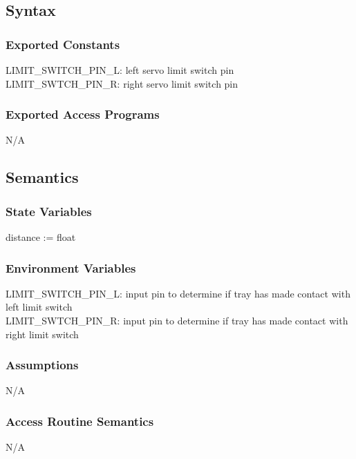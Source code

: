 \documentclass[12pt, titlepage]{article}
\begin{document}
\subsection{Syntax}

\subsubsection{Exported Constants}

LIMIT\_SWITCH\_PIN\_L: left servo limit switch pin\\
LIMIT\_SWTCH\_PIN\_R: right servo limit switch pin\\


\subsubsection{Exported Access Programs}

N/A

\subsection{Semantics}

\subsubsection{State Variables}

distance := float
\subsubsection{Environment Variables}

LIMIT\_SWITCH\_PIN\_L: input pin to determine if tray has made contact with left limit switch\\
LIMIT\_SWTCH\_PIN\_R: input pin to determine if tray has made contact with right limit switch\\

\subsubsection{Assumptions}

N/A

\subsubsection{Access Routine Semantics}

N/A
\end{document}
